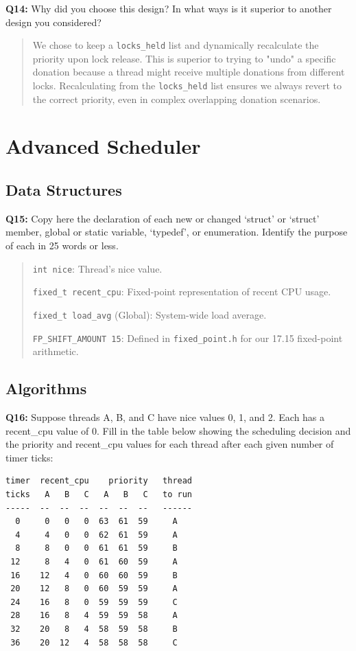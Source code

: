 \documentclass[a4paper,11pt]{paper}
\begin{document}
\textbf{Q14:} Why did you choose this design?  In what ways is it superior to
another design you considered?

\begin{quote}
  We chose to keep a \texttt{locks\_held} list and dynamically recalculate the priority upon lock release. This is superior to trying to "undo" a specific donation because a thread might receive multiple donations from different locks. Recalculating from the \texttt{locks\_held} list ensures we always revert to the correct priority, even in complex overlapping donation scenarios.
\end{quote}

\section{Advanced Scheduler}

\subsection{Data Structures}

\textbf{Q15:} Copy here the declaration of each new or changed `struct' or
`struct' member, global or static variable, `typedef', or enumeration.  Identify
the purpose of each in 25 words or less.

\begin{quote}
  \texttt{int nice}: Thread's nice value.

\texttt{fixed\_t recent\_cpu}: Fixed-point representation of recent CPU usage.

\texttt{fixed\_t load\_avg} (Global): System-wide load average.

\texttt{FP\_SHIFT\_AMOUNT 15}: Defined in \texttt{fixed\_point.h} for our 17.15 fixed-point arithmetic.
\end{quote}

\subsection{Algorithms}

\textbf{Q16:} Suppose threads A, B, and C have nice values 0, 1, and 2.  Each
has a recent\_cpu value of 0.  Fill in the table below showing the scheduling
decision and the priority and recent\_cpu values for each thread after each
given number of timer ticks:

\small
\begin{Verbatim}[frame=single]
timer  recent_cpu    priority   thread
ticks   A   B   C   A   B   C   to run
-----  --  --  --  --  --  --   ------
  0     0   0   0  63  61  59     A
  4     4   0   0  62  61  59     A
  8     8   0   0  61  61  59     B
 12     8   4   0  61  60  59     A
 16    12   4   0  60  60  59     B
 20    12   8   0  60  59  59     A
 24    16   8   0  59  59  59     C
 28    16   8   4  59  59  58     A
 32    20   8   4  58  59  58     B
 36    20  12   4  58  58  58     C
\end{Verbatim}
\end{document}
